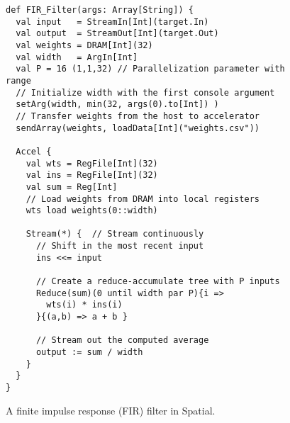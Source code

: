
\begin{figure}
\centering
\newsavebox{\firFilter}
\begin{lrbox}{\firFilter}
\begin{lstlisting}[language=Spatial,linewidth=0.7\columnwidth]
def FIR_Filter(args: Array[String]) {
  val input   = StreamIn[Int](target.In)
  val output  = StreamOut[Int](target.Out)
  val weights = DRAM[Int](32)
  val width   = ArgIn[Int]
  val P = 16 (1,1,32) // Parallelization parameter with range
  // Initialize width with the first console argument
  setArg(width, min(32, args(0).to[Int]) )
  // Transfer weights from the host to accelerator
  sendArray(weights, loadData[Int]("weights.csv"))

  Accel {
    val wts = RegFile[Int](32)
    val ins = RegFile[Int](32)
    val sum = Reg[Int]
    // Load weights from DRAM into local registers
    wts load weights(0::width)

    Stream(*) {  // Stream continuously
      // Shift in the most recent input
      ins <<= input

      // Create a reduce-accumulate tree with P inputs
      Reduce(sum)(0 until width par P){i =>
        wts(i) * ins(i)
      }{(a,b) => a + b }

      // Stream out the computed average
      output := sum / width
    }
  }
}
\end{lstlisting}
\end{lrbox}

\hspace{-30pt}\usebox{\firFilter}
\caption{A finite impulse response (FIR) filter in Spatial.}
\label{fig:firfilter}
\end{figure}
